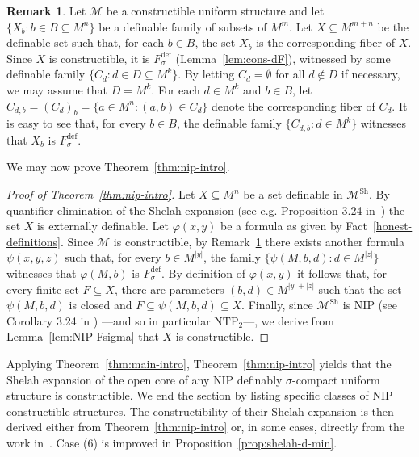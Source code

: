 \documentclass[12pt]{article}
\newcommand{\Mm}{\mathcal{M}}
\newcommand{\Rr}{\mathcal{R}}
\newcommand{\dF}{\ensuremath{F_\sigma^{\text{def}}}}
\newcommand{\Msh}{\Mm^{\text{Sh}}}
\newcommand{\NIP}{\ensuremath{\mathrm{NIP}}}
\newcommand{\NTP}{\ensuremath{\mathrm{NTP}_2}}
\theoremstyle{definition}
\newtheorem{remark}[theorem]{Remark}
\theoremstyle{remark}
\begin{document}
\begin{remark}\label{rem:dF-uniform}
Let $\Mm$ be a constructible uniform structure and let $\{ X_b : b\in B \subseteq M^n\}$ be a definable family of subsets of $M^m$. Let $X\subseteq M^{m+n}$ be the definable set such that, for each $b\in B$, the set $X_b$ is the corresponding fiber of $X$. Since $X$ is constructible, it is $\dF$ (Lemma~\ref{lem:cons-dF}), witnessed by some definable family $\{ C_d : d\in D\subseteq M^k\}$. By letting $C_d=\emptyset$ for all $d\notin D$ if necessary, we may assume that $D=M^{k}$. For each $d\in M^k$ and $b\in B$, let $C_{d,b}=(C_d)_b=\{ a\in M^n : (a,b)\in C_d\}$ denote the corresponding fiber of $C_d$. It is easy to see that, for every $b\in B$, the definable family $\{ C_{d,b} : d\in M^k\}$ witnesses that $X_b$ is $\dF$. 
\end{remark}

We may now prove Theorem~\ref{thm:nip-intro}.  

\begin{proof}[Proof of Theorem~\ref{thm:nip-intro}]
Let $X\subseteq M^n$ be a set definable in $\Msh$. By quantifier elimination of the Shelah expansion (see e.g. Proposition 3.24 in~\cite{simon:guide-NIP}) the set $X$ is externally definable. Let $\varphi(x,y)$ be a formula as given by Fact~\ref{honest-definitions}. Since $\Mm$ is constructible, by Remark~\ref{rem:dF-uniform} there exists another formula $\psi(x,y,z)$ such that, for every $b\in M^{|y|}$, the family $\{\psi(M,b,d) : d\in M^{|z|}\}$ witnesses that $\varphi(M,b)$ is $\dF$. By definition of $\varphi(x,y)$ it follows that, for every finite set $F\subseteq X$, there are parameters $(b,d)\in M^{|y|+|z|}$ such that the set $\psi(M,b,d)$ is closed and $F\subseteq \psi(M,b,d)\subseteq X$. Finally, since $\Msh$ is $\NIP$ (see Corollary 3.24 in \cite{simon:guide-NIP}) ---and so in particular $\NTP$---, we derive from Lemma~\ref{lem:NIP-Fsigma} that $X$ is constructible. 
\end{proof}

Applying Theorem~\ref{thm:main-intro}, Theorem~\ref{thm:nip-intro} yields that the Shelah expansion of the open core of any $\NIP$ definably $\sigma$-compact uniform structure is constructible. We end the section by listing specific classes of $\NIP$ constructible structures. The constructibility of their Shelah expansion is then derived either from Theorem~\ref{thm:nip-intro} or, in some cases, directly from the work in~\cite{sim-wals19}. Case (6) is improved in Proposition~\ref{prop:shelah-d-min}.
\end{document}
